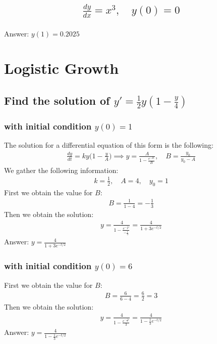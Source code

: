 \documentclass{article}
\begin{document}
\subsection{
	\begin{align*}
		\frac{dy}{dx} = x^3, \quad y(0) = 0
	\end{align*}
}
Answer: $y(1) = 0.2025$

\section{Logistic Growth}
\subsection{Find the solution of $y' = \frac{1}{2}y(1 - \frac{y}{4})$}
\subsubsection{with initial condition $y(0) = 1$}
The solution for a differential equation of this form is the following:
\begin{align*}
	\frac{dy}{dt} = ky \bigg( 1 - \frac{y}{A} \bigg) \implies y = \frac{A}{1 - \frac{e^{-kt}}{B}}, \quad B = \frac{y_0}{y_0 - A}
\end{align*}
We gather the following information:
\begin{align*}
	k = \frac{1}{2}, \quad A = 4, \quad y_0 = 1
\end{align*}
First we obtain the value for $B$:
\begin{align*}
	B = \frac{1}{1 - 4} = -\frac{1}{3}
\end{align*}
Then we obtain the solution:
\begin{align*}
	y = \frac{4}{1 - \frac{e^{-\frac{1}{2}t}}{-\frac{1}{3}}} = \frac{4}{1 + 3e^{-t/2}}
\end{align*}
Answer: $y = \frac{4}{1 + 3e^{-t/2}}$
\subsubsection{with initial condition $y(0) = 6$}
First we obtain the value for $B$:
\begin{align*}
	B = \frac{6}{6 - 4} = \frac{6}{2} = 3
\end{align*}
Then we obtain the solution:
\begin{align*}
	y = \frac{4}{1 - \frac{e^{-\frac{1}{2}t}}{3}} = \frac{4}{1 - \frac{1}{3}e^{-t/2}}
\end{align*}
Answer: $y = \frac{4}{1 - \frac{1}{3}e^{-t/2}}$
\end{document}
